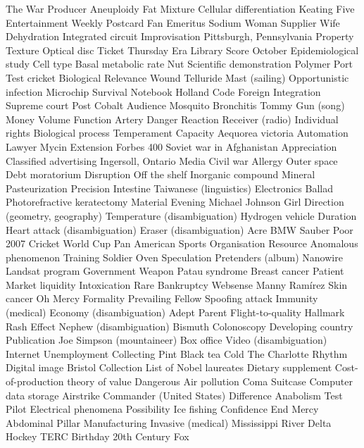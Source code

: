 The War  Producer  Aneuploidy  
Fat  Mixture  Cellular differentiation  
Keating Five  Entertainment Weekly  Postcard  
Fan  Emeritus  Sodium  
Woman  Supplier  Wife  
Dehydration  Integrated circuit  Improvisation  
Pittsburgh, Pennsylvania  Property  Texture  
Optical disc  Ticket  Thursday  
Era  Library  Score  
October  Epidemiological study  Cell type  
Basal metabolic rate  Nut  Scientific demonstration  
Polymer  Port  Test cricket  
Biological  Relevance  Wound  
Telluride  Mast (sailing)  Opportunistic infection  
Microchip  Survival  Notebook  
Holland  Code  Foreign  
Integration  Supreme court  Post  
Cobalt  Audience  Mosquito  
Bronchitis  Tommy Gun (song)  Money  
Volume  Function  Artery  
Danger  Reaction  Receiver (radio)  
Individual rights  Biological process  Temperament  
Capacity  Aequorea victoria  Automation  
Lawyer  Mycin  Extension  
Forbes 400  Soviet war in Afghanistan  Appreciation  
Classified advertising  Ingersoll, Ontario  Media  
Civil war  Allergy  Outer space  
Debt moratorium  Disruption  Off the shelf  
Inorganic compound  Mineral  Pasteurization  
Precision  Intestine  Taiwanese (linguistics)  
Electronics  Ballad  Photorefractive keratectomy  
Material  Evening  Michael Johnson  
Girl  Direction (geometry, geography)  Temperature (disambiguation)  
Hydrogen vehicle  Duration  Heart attack (disambiguation)  
Eraser (disambiguation)  Acre  BMW Sauber  
Poor  2007 Cricket World Cup  Pan American Sports Organisation  
Resource  Anomalous phenomenon  Training  
Soldier  Oven  Speculation  
Pretenders (album)  Nanowire  Landsat program  
Government  Weapon  Patau syndrome  
Breast cancer  Patient  Market liquidity  
Intoxication  Rare  Bankruptcy  
Websense  Manny Ramírez  Skin cancer  
Oh Mercy  Formality  Prevailing  
Fellow  Spoofing attack  Immunity (medical)  
Economy (disambiguation)  Adept  Parent  
Flight-to-quality  Hallmark  Rash  
Effect  Nephew (disambiguation)  Bismuth  
Colonoscopy  Developing country  Publication  
Joe Simpson (mountaineer)  Box office  Video (disambiguation)  
Internet  Unemployment  Collecting  
Pint  Black tea  Cold  
The Charlotte  Rhythm  Digital image  
Bristol  Collection  List of Nobel laureates  
Dietary supplement  Cost-of-production theory of value  Dangerous  
Air pollution  Coma  Suitcase  
Computer data storage  Airstrike  Commander (United States)  
Difference  Anabolism  Test Pilot  
Electrical phenomena  Possibility  Ice fishing  
Confidence  End  Mercy  
Abdominal  Pillar  Manufacturing  
Invasive (medical)  Mississippi River Delta  Hockey  
TERC  Birthday  20th Century Fox  
